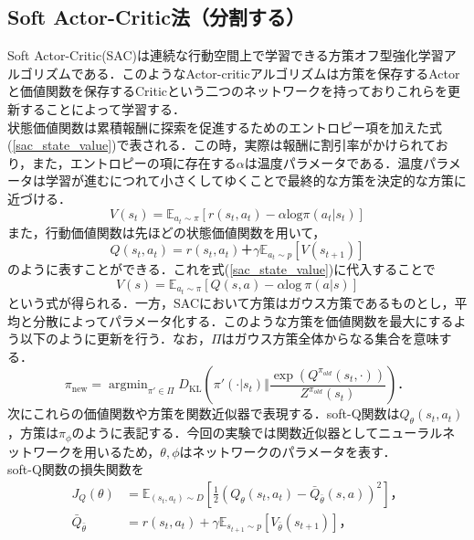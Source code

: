 \documentclass[dvipdfmx]{ampbt_nomag}
\begin{document}
\subsection{Soft Actor-Critic法（分割する）}
Soft Actor-Critic(SAC)\cite{SAC1,SAC2}は連続な行動空間上で学習できる方策オフ型強化学習アルゴリズムである．このようなActor-criticアルゴリズムは方策を保存するActorと価値関数を保存するCriticという二つのネットワークを持っておりこれらを更新することによって学習する．\\
状態価値関数は累積報酬に探索を促進するためのエントロピー項を加えた式(\ref{sac_state_value})で表される．この時，実際は報酬に割引率がかけられており，また，エントロピーの項に存在する$\alpha$は温度パラメータである．温度パラメータは学習が進むにつれて小さくしてゆくことで最終的な方策を決定的な方策に近づける．
\begin{equation} \label{sac_state_value}
 V(s_t) = \mathbb{E}_{a_t\sim\pi}\left[r(s_{t},a_{t}) - \alpha \textrm{log}\pi (a_{t}|s_{t}) \right] 
\end{equation}
また，行動価値関数は先ほどの状態価値関数を用いて，
\begin{equation} \label{sac_act_value}
  Q(s_t,a_t) = r(s_{t},a_{t})＋\gamma \mathbb{E}_{a_t\sim p}[V(s_{t+1})]
\end{equation}
のように表すことができる．これを式(\ref{sac_state_value})に代入することで
\begin{equation} \label{sac_v_q}
  V(s) = \mathbb{E}_{a_t\sim\pi} \left[Q(s,a) - \alpha \textrm{log}~\pi (a|s)  \right]
\end{equation}
という式が得られる．一方，SACにおいて方策はガウス方策であるものとし，平均と分散によってパラメータ化する．このような方策を価値関数を最大にするよう以下のように更新を行う．なお，$\Pi$はガウス方策全体からなる集合を意味する．
\begin{equation} \label{sac_policy_iter}
  \pi_{\mathrm{new}} = \mathop{\textrm{argmin}}_{\pi'\in\Pi}D_\mathrm{KL}\left(\pi'(\cdot|s_t) \bigg\Vert
  \frac{\exp(Q^{\pi_{old}}(s_t,\cdot))}{Z^{\pi_{old}}(s_t)} \right)．
\end{equation}
次にこれらの価値関数や方策を関数近似器で表現する．soft-Q関数は$Q_\theta(s_t,a_t)$，方策は$\pi_\phi$のように表記する．今回の実験では関数近似器としてニューラルネットワークを用いるため，$\theta,\phi$はネットワークのパラメータを表す．\\
soft-Q関数の損失関数を
\begin{align} \label{sac_value_loss}
  J_Q(\theta) &= \mathbb{E}_{(s_t,a_t) \sim D} \left[ \frac{1}{2}\left( Q_\theta(s_t,a_t) - \bar{Q}_{\bar{\theta}}(s,a) \right)^2 \right]， \\
  \bar{Q}_{\bar{\theta}} &= r(s_t,a_t) + \gamma \mathbb{E}_{s_{t+1} \sim p}[V_{\bar{\theta}}(s_{t+1})]，
\end{align}
\end{document}
